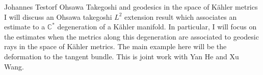 \talk
{%
    Johannes Testorf
}
{%
    Ohsawa Takegoshi and geodesics in the space of Kähler metrics
}
{%
    I will discuss an Ohsawa takegoshi $L^2$ extension result which
    associates an estimate to a $\mathbb C^*$ degeneration of a
    Kähler manifold. In particular, I will focus on the estimates
    when the metrics along this degeneration are associated to
    geodesic rays in the space of Kähler metrics. The main example
    here will be the deformation to the tangent bundle. This is
    joint work with Yan He and Xu Wang.
}
